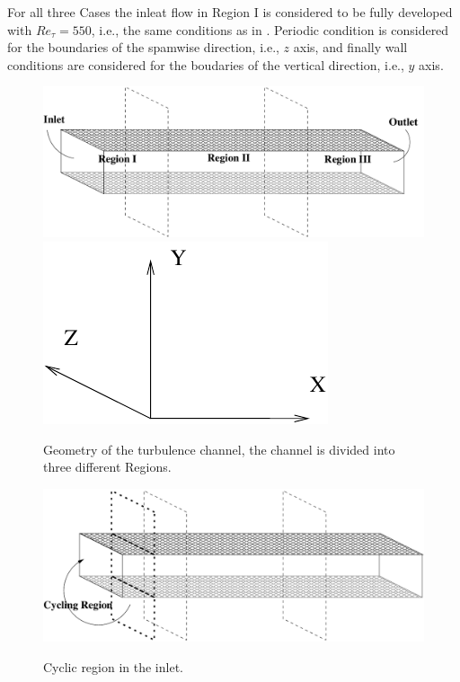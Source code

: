 \documentclass[twocolumn,10pt]{asme2e}
\begin{document}
For all three Cases the inleat flow in Region I is considered to be fully developed with \(Re_{\tau}=550\), i.e., the same conditions as in \cite{hoyas2008}. Periodic condition is considered for the boundaries of the spamwise direction, i.e., \(z\) axis, and finally wall conditions are considered for the boudaries of the vertical direction, i.e., \(y\) axis.

\begin{figure}[!htbp]
	\centering
	\scalebox{0.5}
	{\includegraphics{geometry_turbchannel.pdf}}
	\scalebox{0.4}
	{\includegraphics{axis.pdf}}
	\caption{Geometry of the turbulence channel, the channel is divided into three different Regions.}
	\label{fig:geometry_turbchannel}
	\end{figure}

\begin{figure}[!htbp]
	\centering
	\scalebox{0.5}
	{\includegraphics{cycling_region.pdf}}
	\caption{Cyclic region in the inlet.}
	\label{fig:cycling_region}
\end{figure}
\end{document}
